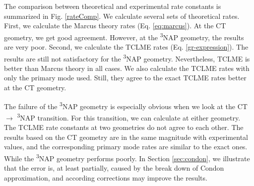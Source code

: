 The comparison between theoretical and experimental rate constants is summarized in Fig. \ref{rateComp}. We calculate several sets of theoretical rates. First, we calculate the Marcus theory rates (Eq. \ref{eq:marcus}). At the CT geometry, we get good agreement. However, at the \textsuperscript{3}NAP geometry, the results are very poor. Second, we calculate the TCLME rates (Eq. \ref{gr-expression}). The results are still not satisfactory for the \textsuperscript{3}NAP geometry. Nevertheless, TCLME is better than Marcus theory in all cases. We also calculate the TCLME rates with only the primary mode used. Still, they agree to the exact TCLME rates better at the CT geometry.

The failure of the \textsuperscript{3}NAP geometry is especially obvious when we look at the CT $\rightarrow$ \textsuperscript{3}NAP transition. For this transition, we can calculate at either geometry. The TCLME rate constants at two geometries do not agree to each other. The results based on the CT geometry are in the same magnitude with experimental values, and the corresponding primary mode rates are similar to the exact ones. While the \textsuperscript{3}NAP geometry performs poorly. In Section \ref{sec:condon}, we illustrate that the error is, at least partially, caused by the break down of Condon approximation, and according corrections may improve the results.

